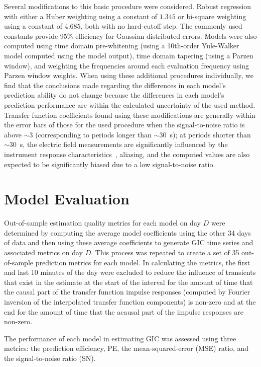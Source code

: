 \documentclass[draft,linenumbers]{agujournal2018}
\begin{document}
Several modifications to this basic procedure were considered. Robust regression \citep{Egbert1986} with either a Huber weighting using a constant of $1.345$ or bi-square weighting using a constant of $4.685$, both with no hard-cutoff step. The commonly used constants provide 95\% efficiency for Gaussian-distributed errors. Models were also computed using time domain pre-whitening (using a 10th-order Yule-Walker model computed using the model output), time domain tapering (using a Parzen window), and weighting the frequencies around each evaluation frequency using Parzen window weights. When using these additional procedures individually, we find that the conclusions made regarding the differences in each model's prediction ability do not change because the differences in each model's prediction performance are within the calculated uncertainty of the used method. Transfer function coefficients found using these modifications are generally within the error bars of those for the used procedure when the signal-to-noise ratio is above $\sim$3 (corresponding to periods longer than $\sim$30~s); at periods shorter than $\sim$30~s, the electric field measurements are significantly influenced by the instrument response characteristics~\citep{Fujii2015}, aliasing, and the computed values are also expected to be significantly biased due to a low signal-to-noise ratio.

\section{Model Evaluation}
\label{section:Model_Evaluation}

Out-of-sample estimation quality metrics for each model on day $D$ were determined by computing the average model coefficients using the other 34 days of data and then using these average coefficients to generate GIC time series and associated metrics on day $D$. This process was repeated to create a set of 35 out-of-sample prediction metrics for each model. In calculating the metrics, the first and last 10 minutes of the day were excluded to reduce the influence of transients that exist in the estimate at the start of the interval for the amount of time that the causal part of the transfer function impulse responses (computed by Fourier inversion of the interpolated transfer function components) is non-zero and at the end for the amount of time that the acausal part of the impulse responses are non-zero.

The performance of each model in estimating GIC was assessed using three metrics: the prediction efficiency, PE, the mean-squared-error (MSE) ratio, and the signal-to-noise ratio (SN).
\end{document}
